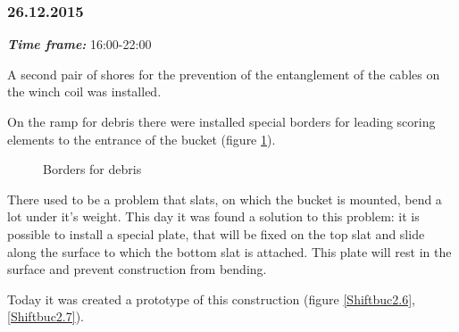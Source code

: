 \subsubsection{26.12.2015}
\textit{\textbf{Time frame:}} 16:00-22:00

A second pair of shores for the prevention of the entanglement of the cables on the winch coil was installed.

On the ramp for debris there were installed special borders for leading scoring elements to the entrance of the bucket (figure \ref{Gripper2.3}).

\begin{figure}[H]
	\begin{minipage}[h]{1\linewidth}
		\caption{Borders for debris}
		\label{Gripper2.3}
	\end{minipage}
\end{figure}

There used to be a problem that slats, on which the bucket is mounted, bend a lot under it's weight. This day it was found a solution to this problem: it is possible to install a special plate, that will be fixed on the top slat and slide along the surface to which the bottom slat is attached. This plate will rest in the surface and prevent construction from bending.

Today it was created a prototype of this construction (figure \ref{Shiftbuc2.6}, \ref{Shiftbuc2.7}).

